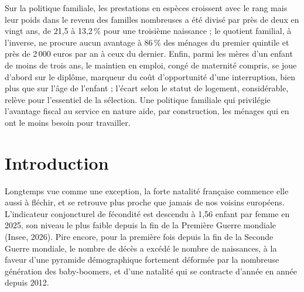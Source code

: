 \documentclass[12pt,a4paper]{article}
\begin{document}
\noindent Sur la politique familiale, les prestations en espèces croissent avec le rang mais leur poids dans le revenu des familles nombreuses a été divisé par près de deux en vingt ans, de 21,5 à 13,2\,\% pour une troisième naissance ; le quotient familial, à l'inverse, ne procure aucun avantage à 86\,\% des ménages du premier quintile et près de 2\,000 euros par an à ceux du dernier. Enfin, parmi les mères d'un enfant de moins de trois ans, le maintien en emploi, congé de maternité compris, se joue d'abord sur le diplôme, marqueur du coût d'opportunité d'une interruption, bien plus que sur l'âge de l'enfant ; l'écart selon le statut de logement, considérable, relève pour l'essentiel de la sélection. Une politique familiale qui privilégie l'avantage fiscal au service en nature aide, par construction, les ménages qui en ont le moins besoin pour travailler.
	
	\newpage
	
	\tableofcontents
	\thispagestyle{plain}
	\newpage
	
	\section{Introduction}
	
Longtemps vue comme une exception, la forte natalité française commence elle aussi à fléchir, et se retrouve plus proche que jamais de nos voisins européens. L’indicateur conjoncturel de fécondité est descendu à 1,56 enfant par femme en 2025, son niveau le plus faible depuis la fin de la Première Guerre mondiale (Insee, 2026). Pire encore, pour la première fois depuis la fin de la Seconde Guerre mondiale, le nombre de décès a excédé le nombre de naissances, à la faveur d’une pyramide démographique fortement déformée par la nombreuse génération des baby-boomers, et d’une natalité qui se contracte d’année en année depuis 2012. \\
\end{document}
